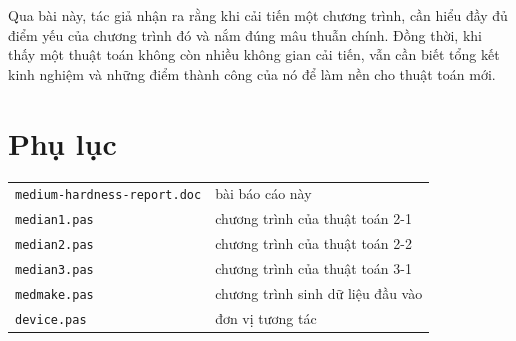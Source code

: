\documentclass[11pt]{article}
\begin{document}
Qua bài này, tác giả nhận ra rằng khi cải tiến một chương trình, cần hiểu đầy
đủ điểm yếu của chương trình đó và nắm đúng mâu thuẫn chính. Đồng thời, khi
thấy một thuật toán không còn nhiều không gian cải tiến, vẫn cần biết tổng kết
kinh nghiệm và những điểm thành công của nó để làm nền cho thuật toán mới.

\section*{Phụ lục}

\begin{tabular}{ll}
\texttt{medium-hardness-report.doc} & bài báo cáo này\\
\texttt{median1.pas} & chương trình của thuật toán 2-1\\
\texttt{median2.pas} & chương trình của thuật toán 2-2\\
\texttt{median3.pas} & chương trình của thuật toán 3-1\\
\texttt{medmake.pas} & chương trình sinh dữ liệu đầu vào\\
\texttt{device.pas} & đơn vị tương tác\\
\end{tabular}
\end{document}
